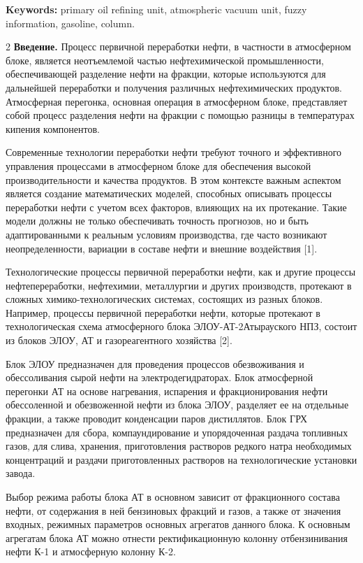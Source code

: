{\bfseries Keywords:} primary oil refining unit, atmospheric vacuum unit,
fuzzy information, gasoline, column.

\begin{multicols}{2}
{\bfseries Введение.} Процесс первичной переработки нефти, в частности в
атмосферном блоке, является неотъемлемой частью нефтехимической
промышленности, обеспечивающей разделение нефти на фракции, которые
используются для дальнейшей переработки и получения различных
нефтехимических продуктов. Атмосферная перегонка, основная операция в
атмосферном блоке, представляет собой процесс разделения нефти на
фракции с помощью разницы в температурах кипения компонентов.

Современные технологии переработки нефти требуют точного и эффективного
управления процессами в атмосферном блоке для обеспечения высокой
производительности и качества продуктов. В этом контексте важным
аспектом является создание математических моделей, способных описывать
процессы переработки нефти с учетом всех факторов, влияющих на их
протекание. Такие модели должны не только обеспечивать точность
прогнозов, но и быть адаптированными к реальным условиям производства,
где часто возникают неопределенности, вариации в составе нефти и внешние
воздействия {[}1{]}.

Технологические процессы первичной переработки нефти, как и другие
процессы нефтепереработки, нефтехимии, металлургии и других производств,
протекают в сложных химико-технологических системах, состоящих из разных
блоков. Например, процессы первичной переработки нефти, которые
протекают в технологическая схема атмосферного блока
ЭЛОУ-АТ-2Атырауского НПЗ, состоит из блоков ЭЛОУ, АТ и газореагентного
хозяйства {[}2{]}.

Блок ЭЛОУ предназначен для проведения процессов обезвоживания и
обессоливания сырой нефти на электродегидраторах. Блок атмосферной
перегонки АТ на основе нагревания, испарения и фракционирования нефти
обессоленной и обезвоженной нефти из блока ЭЛОУ, разделяет ее на
отдельные фракции, а также проводит конденсации паров дистиллятов. Блок
ГРХ предназначен для сбора, компаундирование и упорядоченная раздача
топливных газов, для слива, хранения, приготовления растворов редкого
натра необходимых концентраций и раздачи приготовленных растворов на
технологические установки завода.

Выбор режима работы блока АТ в основном зависит от фракционного состава
нефти, от содержания в ней бензиновых фракций и газов, а также от
значения входных, режимных параметров основных агрегатов данного блока.
К основным агрегатам блока АТ можно отнести ректификационную колонну
отбензинивания нефти К-1 и атмосферную колонну К-2.


\end{multicols}
